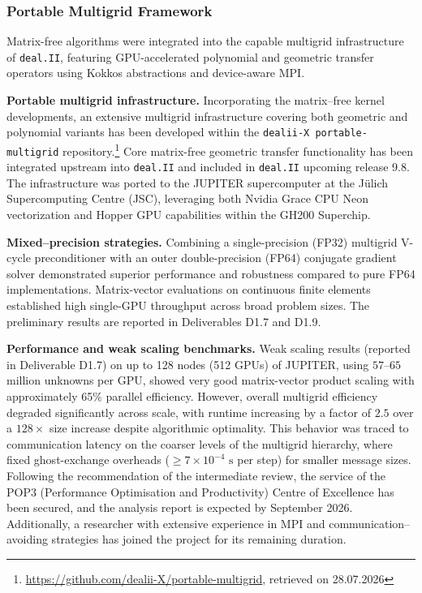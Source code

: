 \documentclass[a4paper,12pt, numbers]{article}
\newcommand{\dealii}{\texttt{deal.II}}
\begin{document}
\subsubsection*{Portable Multigrid Framework}

\noindent Matrix-free algorithms were integrated into the capable multigrid infrastructure of \dealii{}, featuring GPU-accelerated polynomial and geometric transfer operators using Kokkos abstractions and device-aware MPI.

\noindent\textbf{Portable multigrid infrastructure.}  Incorporating the matrix--free kernel developments, an extensive multigrid infrastructure covering both geometric and polynomial variants has been developed within the \texttt{dealii-X portable-multigrid} repository.\footnote{\url{https://github.com/dealii-X/portable-multigrid}, retrieved on 28.07.2026} Core matrix-free geometric transfer functionality has been integrated upstream into \dealii{} and included in \dealii{} upcoming release 9.8. The infrastructure was ported to the JUPITER supercomputer at the Jülich Supercomputing Centre (JSC), leveraging both Nvidia Grace CPU Neon vectorization and Hopper GPU capabilities within the GH200 Superchip. 

\noindent\textbf{Mixed--precision strategies.}
Combining a single-precision (FP32) multigrid V-cycle preconditioner with an outer double-precision (FP64) conjugate gradient solver demonstrated superior performance and robustness compared to pure FP64 implementations. Matrix-vector evaluations on continuous finite elements established high single-GPU throughput across broad problem sizes. The preliminary results are reported in Deliverables D1.7 and D1.9.

\noindent\textbf{Performance and weak scaling benchmarks.}
Weak scaling results (reported in Deliverable D1.7) on up to 128 nodes (512 GPUs) of JUPITER, using $57$--$65$ million unknowns per GPU, showed very good matrix-vector product scaling with approximately 65\% parallel efficiency. However, overall multigrid efficiency degraded significantly across scale, with runtime increasing by a factor of $2.5$ over a $128\times$ size increase despite algorithmic optimality. This behavior was traced to communication latency on the coarser levels of the multigrid hierarchy, where fixed ghost-exchange overheads ($\ge 7 \times 10^{-4}\text{ s}$ per step) for smaller message sizes. Following the recommendation of the intermediate review, the service of the POP3 (Performance Optimisation and Productivity) Centre of Excellence has been secured, and the analysis report is expected by September 2026. Additionally, a researcher with extensive experience in MPI and communication--avoiding strategies has joined the project for its remaining duration.
\end{document}

